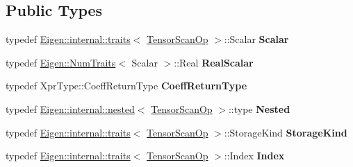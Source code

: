 \subsection*{Public Types}
\begin{DoxyCompactItemize}
\item 
\mbox{\label{class_eigen_1_1_tensor_scan_op_a4729aae7a2a4bfa4b28c6a3e0cf057bc}} 
typedef \hyperlink{struct_eigen_1_1internal_1_1traits}{Eigen\+::internal\+::traits}$<$ \hyperlink{class_eigen_1_1_tensor_scan_op}{Tensor\+Scan\+Op} $>$\+::Scalar {\bfseries Scalar}
\item 
\mbox{\label{class_eigen_1_1_tensor_scan_op_a8288bbf4fee44b48216a4f474e232cdb}} 
typedef \hyperlink{group___core___module_struct_eigen_1_1_num_traits}{Eigen\+::\+Num\+Traits}$<$ Scalar $>$\+::Real {\bfseries Real\+Scalar}
\item 
\mbox{\label{class_eigen_1_1_tensor_scan_op_a13b25e77a08992deabbd320172044e79}} 
typedef Xpr\+Type\+::\+Coeff\+Return\+Type {\bfseries Coeff\+Return\+Type}
\item 
\mbox{\label{class_eigen_1_1_tensor_scan_op_a1c30340cc47c0e0066f1daa24ee8a656}} 
typedef \hyperlink{struct_eigen_1_1internal_1_1nested}{Eigen\+::internal\+::nested}$<$ \hyperlink{class_eigen_1_1_tensor_scan_op}{Tensor\+Scan\+Op} $>$\+::type {\bfseries Nested}
\item 
\mbox{\label{class_eigen_1_1_tensor_scan_op_a291ad6ceb9b864bd67712e00efd5115f}} 
typedef \hyperlink{struct_eigen_1_1internal_1_1traits}{Eigen\+::internal\+::traits}$<$ \hyperlink{class_eigen_1_1_tensor_scan_op}{Tensor\+Scan\+Op} $>$\+::Storage\+Kind {\bfseries Storage\+Kind}
\item 
\mbox{\label{class_eigen_1_1_tensor_scan_op_abad0ac80094f927d232d462c0e38d67b}} 
typedef \hyperlink{struct_eigen_1_1internal_1_1traits}{Eigen\+::internal\+::traits}$<$ \hyperlink{class_eigen_1_1_tensor_scan_op}{Tensor\+Scan\+Op} $>$\+::Index {\bfseries Index}
\item 
\mbox{\label{class_eigen_1_1_tensor_scan_op_a4729aae7a2a4bfa4b28c6a3e0cf057bc}} 

\end{DoxyCompactItemize}
